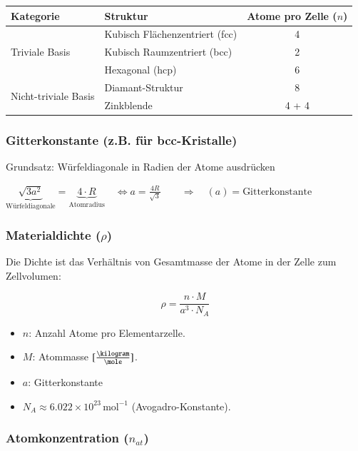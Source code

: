 \begin{tabular}{|l|l|c|}
\hline
\textbf{Kategorie} & \textbf{Struktur} & \textbf{Atome pro Zelle ($n$)} \\ \hline
\multirow{3}{*}{Triviale Basis} & Kubisch Flächenzentriert (fcc) & 4 \\ \cline{2-3} 
 & Kubisch Raumzentriert (bcc) & 2 \\ \cline{2-3} 
 & Hexagonal (hcp) & 6 \\ \hline
\multirow{2}{*}{Nicht-triviale Basis} & Diamant-Struktur & 8 \\ \cline{2-3} 
 & Zinkblende & 4 + 4 \\ \hline
\end{tabular}

\subsubsection{Gitterkonstante (z.B. für bcc-Kristalle)}
Grundsatz: Würfeldiagonale in Radien der Atome ausdrücken

$ \underbrace{\sqrt{3a^2}}_{\text{Würfeldiagonale}} = \underbrace{4 \cdot R}_{\text{Atomradius}} 
\quad \Leftrightarrow a = \frac{4R}{\sqrt{3}} \qquad \Rightarrow 
\quad (a) = \text{Gitterkonstante} $


\subsubsection{Materialdichte ($\rho$)}

Die Dichte ist das Verhältnis von Gesamtmasse der Atome in der Zelle zum Zellvolumen:

\begin{minipage}{0.4\columnwidth}
	$$\rho = \frac{n \cdot M}{a^3 \cdot N_A}$$
\end{minipage}
\begin{minipage}{0.6\columnwidth}
	\begin{itemize}
		\item $n$: Anzahl Atome pro Elementarzelle.
		\item $M$: Atommasse $[\frac{\kilogram}{\mole}]$.
		\item $a$: Gitterkonstante
		\item $N_A \approx 6.022 \times 10^{23} \, \text{mol}^{-1}$ (Avogadro-Konstante).
	\end{itemize}
\end{minipage}

\subsubsection{Atomkonzentration ($n_{at}$)}

